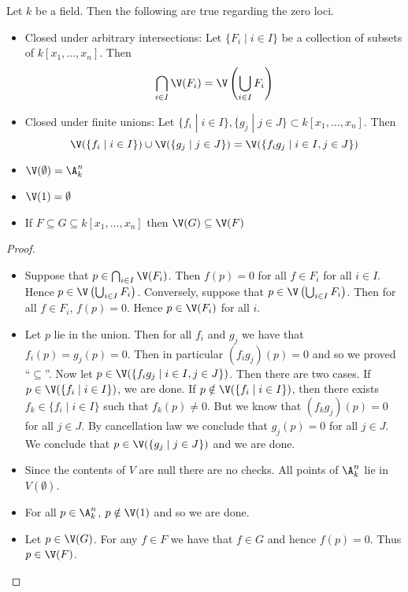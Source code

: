 \documentclass[a4paper]{article}
\begin{document}
\begin{prp}{}{} Let $k$ be a field. Then the following are true regarding the zero loci. 
\begin{itemize}
\item Closed under arbitrary intersections: Let $\{F_i\;|\;i\in I\}$ be a collection of subsets of $k[x_1,\dots,x_n]$. Then $$\bigcap_{i\in I}\V(F_i)=\V\left(\bigcup_{i\in I}F_i\right)$$
\item Closed under finite unions: Let $\{f_i\;|\;i\in I\},\{g_j\;|\;j\in J\}\subset k[x_1,\dots,x_n]$. Then $$\V(\{f_i\;|\;i\in I\})\cup\V(\{g_j\;|\;j\in J\})=\V(\{f_ig_j\;|\;i\in I, j\in J\})$$
\item $\V(\emptyset)=\A_k^n$
\item $\V(1)=\emptyset$
\item If $F\subseteq G\subseteq k[x_1,\dots,x_n]$ then $\V(G)\subseteq\V(F)$
\end{itemize}
\begin{proof}~\\
\begin{itemize}
\item Suppose that $p\in\bigcap_{i\in I}\V(F_i)$. Then $f(p)=0$ for all $f\in F_i$ for all $i\in I$. Hence $p\in\V\left(\bigcup_{i\in I}F_i\right)$. Conversely, suppose that $p\in\V\left(\bigcup_{i\in I}F_i\right)$. Then for all $f\in F_i$, $f(p)=0$. Hence $p\in\V(F_i)$ for all $i$. 
\item Let $p$ lie in the union. Then for all $f_i$ and $g_j$ we have that $f_i(p)=g_j(p)=0$. Then in particular $(f_ig_j)(p)=0$ and so we proved ``$\subseteq$''. Now let $p\in\V(\{f_ig_j\;|\;i\in I, j\in J\})$. Then there are two cases. If $p\in\V(\{f_i\;|\;i\in I\})$, we are done. If $p\notin\V(\{f_i\;|\;i\in I\})$, then there exists $f_k\in\{f_i\;|\;i\in I\}$ such that $f_k(p)\neq 0$. But we know that $(f_kg_j)(p)=0$ for all $j\in J$. By cancellation law we conclude that $g_j(p)=0$ for all $j\in J$. We conclude that $p\in\V(\{g_j\;|\;j\in J\})$ and we are done. 
\item Since the contents of $V$ are null there are no checks. All points of $\A_k^n$ lie in $V(\emptyset)$. 
\item For all $p\in\A_k^n$, $p\notin\V(1)$ and so we are done. 
\item Let $p\in\V(G)$. For any $f\in F$ we have that $f\in G$ and hence $f(p)=0$. Thus $p\in\V(F)$. 
\end{itemize}
\end{proof}
\end{prp}
\end{document}
